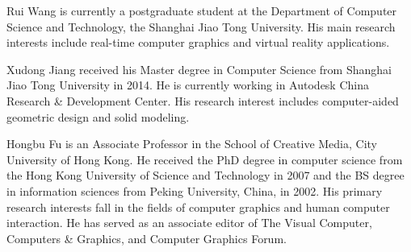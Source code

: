\documentclass[10pt,journal,compsoc]{IEEEtran}
\begin{document}
\appendices







\begin{IEEEbiography}{Rui Wang}
is currently a postgraduate student at the Department of Computer Science and Technology, the Shanghai Jiao Tong University. His main research interests include real-time computer graphics and virtual reality applications.
\end{IEEEbiography}

\begin{IEEEbiography}{Xudong Jiang}
received his Master degree in Computer Science from Shanghai Jiao Tong University in 2014. He is currently working in Autodesk China Research \& Development Center. His research interest includes computer-aided geometric design and solid modeling.
\end{IEEEbiography}


\begin{IEEEbiography}{Hongbu Fu}
is an Associate Professor in the School of Creative Media, City University of Hong Kong. He received the PhD degree in computer science from the Hong Kong University of Science and Technology in 2007 and the BS degree in information sciences from Peking University, China, in 2002. His primary research interests fall in the fields of computer graphics and human computer interaction. He has served as an associate editor of The Visual Computer, Computers \& Graphics, and Computer Graphics Forum.
\end{IEEEbiography}
\end{document}
